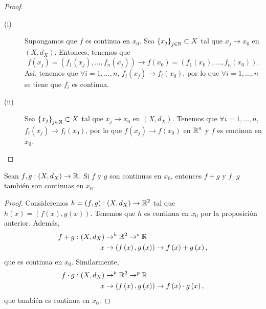 \begin{proof}
\begin{description}
	\item[(i)] Supongamos que $\displaystyle f $ es continua en $\displaystyle x_{0} $. Sea $\displaystyle \left\{ x_{j}\right\} _{j\in \mathbb{N}} \subset X $ tal que $\displaystyle x_{j} \to x_{0} $ en $\displaystyle \left(X, d _{X}\right) $. Entonces, tenemos que 
	\[f\left(x_{j}\right) = \left(f_{1}\left(x_{j}\right), \ldots, f_{n}\left(x_{j}\right)\right) \to f\left(x_{0}\right) = \left(f_{1}\left(x_{0}\right), \ldots, f_{n}\left(x_{0}\right)\right) .\]
	Así, tenemos que $\displaystyle \forall i = 1, \ldots, n $, $\displaystyle f_{i}\left(x_{j}\right) \to f_{i}\left(x_{0}\right) $, por lo que $\displaystyle \forall i = 1, \ldots, n $ se tiene que $\displaystyle f_{i} $ es continua. 
\item[(ii)] Sea $\displaystyle \left\{ x_{j}\right\} _{j \in \mathbb{N}} \subset X $ tal que $\displaystyle x_{j} \to x_{0} $ en $\displaystyle \left(X, d _{X}\right) $. Tenemos que $\displaystyle \forall i = 1, \ldots, n $, $\displaystyle f_{i}\left(x_{j}\right) \to f_{i}\left(x_{0}\right) $, por lo que $\displaystyle f\left(x_{j}\right) \to f\left(x_{0}\right) $ en $\displaystyle \mathbb{R}^{n} $ y $\displaystyle f $ es continua en $\displaystyle x_{0} $.
\end{description}
\end{proof}
\begin{colorary}
Sean $\displaystyle f,g : \left(X, d _{X}\right) \to \mathbb{R} $. Si $\displaystyle f $ y $\displaystyle g $ son continuas en $\displaystyle x_{0} $, entonces $\displaystyle f + g $ y $\displaystyle f \cdot g $ también son continuas en $\displaystyle x_{0} $. 
\end{colorary}
\begin{proof}
Consideremos $\displaystyle h = \left(f,g\right) : \left(X, d _{X}\right) \to \mathbb{R}^{2} $ tal que $\displaystyle h\left(x\right) = \left(f\left(x\right), g\left(x\right)\right) $. Tenemos que $\displaystyle h $ es continua en $\displaystyle x_{0} $ por la proposición anterior. Además,
\[
\begin{split}
	f + g : \left(X, d _{X}\right) & \to^{h} \mathbb{R}^{2} \to^{s} \mathbb{R} \\
	x & \to \left(f\left(x\right), g\left(x\right)\right) \to f\left(x\right) + g\left(x\right),
\end{split}
\]
que es continua en $\displaystyle x_{0} $. Similarmente, 
\[
\begin{split}
	f \cdot g : \left(X, d _{X}\right) & \to^{h} \mathbb{R}^{2} \to^{p} \mathbb{R} \\
	x & \to \left(f\left(x\right), g\left(x\right)\right) \to f\left(x\right) \cdot g\left(x\right),
\end{split}
\]
que también es continua en $\displaystyle x_{0} $.
\end{proof}
